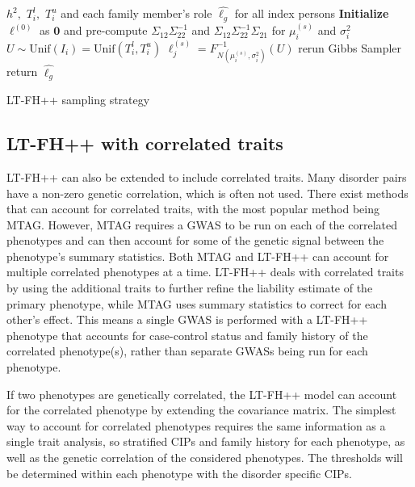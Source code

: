\begin{algorithm}
\begin{algorithmic}[1]
\INPUT $ h^2,$ $T_{i}^l,$ $T_{i}^u$ and each family member's role 
\OUTPUT $ \hat{\ell_g} $ for all index persons
\GIBBS
\STATE \textbf{Initialize} $\ell^{(0)}$ as $ \mathbf{0} $ and pre-compute $ \Sigma_{12} \Sigma_{22}^{-1} $ and $ \Sigma_{12} \Sigma_{22}^{-1} \Sigma_{21} $ for $ \mu_i^{(s)} $ and $ \sigma^2_i $
	  
	\STATE $ U \sim \text{Unif}(I_i) = \text{Unif}(T_i^l, T_i^u) $ 
	\STATE $ \ell_j^{(s)} = F^{-1}_{N(\mu_i^{(s)}, \sigma_i^2)}(U) $
	\ENDFOR
\ENDFOR
{}
\STATE rerun Gibbs Sampler
\ELSE
\STATE return  $ \hat{\ell_g} $
\ENDIF
\end{algorithmic}
\caption{LT-FH++ sampling strategy}
\label{alg:LTFH++}
\end{algorithm}


\subsection{LT-FH++ with correlated traits}
LT-FH++ can also be extended to include correlated traits. Many disorder pairs have a non-zero genetic correlation, which is often not used. There exist methods that can account for correlated traits, with the most popular method being MTAG\cite{turley2018multi}. However, MTAG requires a GWAS to be run on each of the correlated phenotypes and can then account for some of the genetic signal between the phenotype's summary statistics. Both MTAG and LT-FH++ can account for multiple correlated phenotypes at a time. LT-FH++ deals with correlated traits by using the additional traits to further refine the liability estimate of the primary phenotype, while MTAG uses summary statistics to correct for each other's effect. This means a single GWAS is performed with a LT-FH++ phenotype that accounts for case-control status and family history of the correlated phenotype(s), rather than separate GWASs being run for each phenotype. 

If two phenotypes are genetically correlated, the LT-FH++ model can account for the correlated phenotype by extending the covariance matrix. The simplest way to account for correlated phenotypes requires the same information as a single trait analysis, so stratified CIPs and family history for each phenotype, as well as the genetic correlation of the considered phenotypes. The thresholds will be determined within each phenotype with the disorder specific CIPs.

